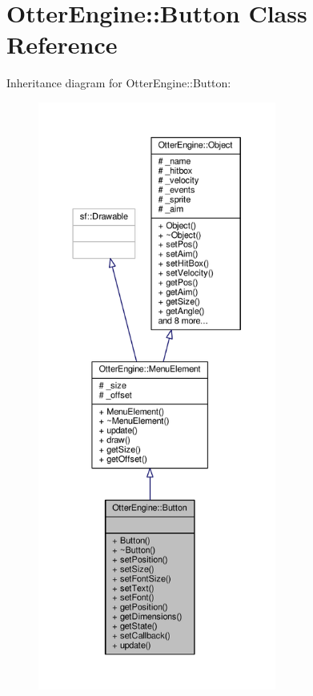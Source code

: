 \hypertarget{class_otter_engine_1_1_button}{}\section{Otter\+Engine\+:\+:Button Class Reference}
\label{class_otter_engine_1_1_button}


Inheritance diagram for Otter\+Engine\+:\+:Button\+:\nopagebreak
\begin{figure}[H]
\begin{center}
\leavevmode
\includegraphics[height=550pt]{d4/d75/class_otter_engine_1_1_button__inherit__graph}
\end{center}
\end{figure}


